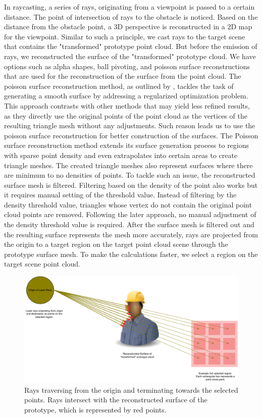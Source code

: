 In raycasting, a series of rays, originating from a viewpoint is passed to a certain distance. The point of intersection of rays to the obstacle is noticed. Based on the distance from the obstacle point, a 3D perspective is reconstructed in a 2D map for the viewpoint. Similar to such a principle, we cast rays to the target scene that contains the "transformed" prototype point cloud. But before the emission of rays, we reconstructed the surface of the "transformed" prototype cloud. We have options such as alpha shapes, ball pivoting, and poisson surface reconstructions that are used for the reconstruction of the surface from the point cloud. The poisson surface reconstruction method, as outlined by \parencite{kazhdan2006poisson}, tackles the task of generating a smooth surface by addressing a regularized optimization problem. This approach contrasts with other methods that may yield less refined results, as they directly use the original points of the point cloud as the vertices of the resulting triangle mesh without any adjustments. Such reason leads us to use the poisson surface reconstruction for better construction of the surfaces. The Poisson surface reconstruction method extends its surface generation process to regions with sparse point density and even extrapolates into certain areas to create triangle meshes. The created triangle meshes also represent surfaces where there are minimum to no densities of points. To tackle such an issue, the reconstructed surface mesh is filtered. Filtering based on the density of the point also works but it requires manual setting of the threshold value. Instead of filtering by the density threshold value, triangles whose vertex do not contain the original point cloud points are removed. Following the later approach, no manual adjustment of the density threshold value is required.
After the surface mesh is filtered out and the resulting surface represents the mesh more accurately, rays are projected from the origin to a target region on the target point cloud scene through the prototype surface mesh. To make the calculations faster, we select a region on the target scene point cloud.

\begin{figure}[htbp]
    \centering
    \includegraphics[width=1\linewidth]{97_graphics/concepts/raycasting.pdf}
    \caption{Rays traversing from the origin and terminating towards the selected points. Rays intersect with the reconstructed surface of the prototype, which is represented by red points.}
    \label{fig:raycasting}
\end{figure}

